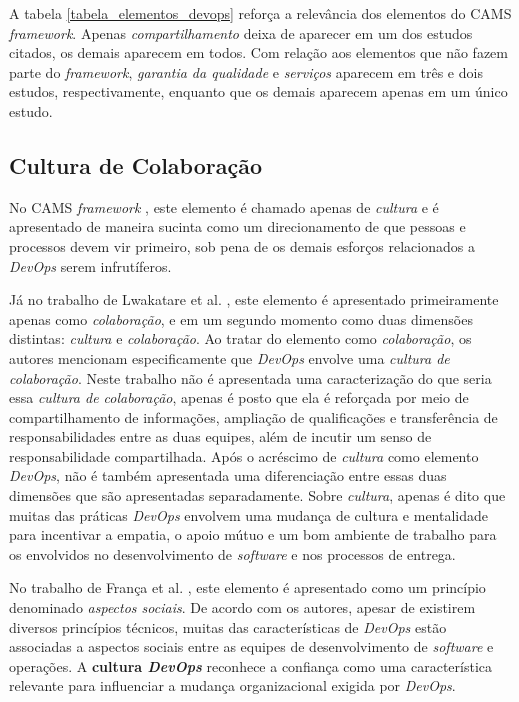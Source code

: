 A tabela \ref{tabela_elementos_devops} reforça a relevância dos elementos do
\acrshort{CAMS} \textit{framework}. Apenas \emph{compartilhamento} deixa de
aparecer em um dos estudos citados, os demais aparecem em todos. Com relação
aos elementos que não fazem parte do \textit{framework}, \emph{garantia
da qualidade} e \emph{serviços} aparecem em três e dois estudos, respectivamente,
enquanto que os demais aparecem apenas em um único estudo.

\subsection{Cultura de Colaboração}

No \acrshort{CAMS} \textit{framework} \cite{what_devops_means_2010}, este
elemento é chamado apenas de \emph{cultura} e é apresentado de maneira sucinta
como um direcionamento de que pessoas e processos devem vir primeiro, sob pena
de os demais esforços relacionados a \textit{DevOps} serem infrutíferos.

Já no trabalho de Lwakatare et al. \cite{dimensions_of_devops,extending_dimensions},
este elemento é apresentado primeiramente apenas como \emph{colaboração}, e em
um segundo momento como duas dimensões distintas: \emph{cultura} e
\emph{colaboração}. Ao tratar do elemento como \emph{colaboração}, os autores
mencionam especificamente que \textit{DevOps} envolve uma \emph{cultura de colaboração}.
Neste trabalho não é apresentada uma caracterização do que seria essa \emph{cultura
de colaboração}, apenas é posto que ela é reforçada por meio de
compartilhamento de informações, ampliação de qualificações e transferência de
responsabilidades entre as duas equipes, além de incutir um senso de
responsabilidade compartilhada. Após o acréscimo de \emph{cultura} como elemento
\textit{DevOps}, não é também apresentada uma diferenciação entre essas duas
dimensões que são apresentadas separadamente. Sobre \emph{cultura}, apenas é
dito que muitas das práticas \textit{DevOps} envolvem uma mudança de cultura e
mentalidade para incentivar a empatia, o apoio mútuo e um bom ambiente de
trabalho para os envolvidos no desenvolvimento de \textit{software} e
nos processos de entrega.

No trabalho de França et al. \cite{characterizing_devops}, este elemento é
apresentado como um princípio denominado \emph{aspectos sociais}. De acordo com os
autores, apesar de existirem diversos princípios técnicos, muitas das
características de \textit{DevOps} estão associadas a aspectos sociais entre as
equipes de desenvolvimento de \textit{software} e operações. A \textbf{cultura
\textit{DevOps}} reconhece a confiança como uma característica relevante para
influenciar a mudança organizacional exigida por \textit{DevOps}.

